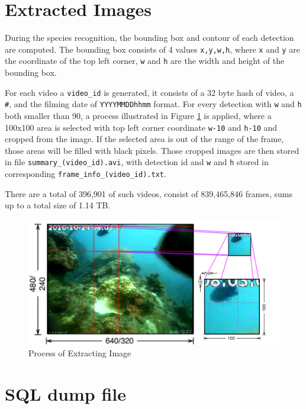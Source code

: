 \documentclass[bsc,logo,twoside,fullspacing,parskip]{infthesis}
\begin{document}
\section{Extracted Images}
\label{sec:summaries}

During the species recognition, the bounding box and contour of each detection are computed.
The bounding box consists of 4 values {\tt x,y,w,h}, where {\tt x} and {\tt y} are the coordinate of the top left corner, {\tt w} and {\tt h} are the width and height of the bounding box. 

For each video a {\tt video\_id} is generated, it consists of a 32 byte hash of video, a {\tt \#}, and the filming date of {\tt YYYYMMDDhhmm} format. 
For every detection with {\tt w} and {\tt h} both smaller than 90, a process illustrated in Figure \ref{fig:extraction} is applied, where a 100x100 area is selected with top left corner coordinate {\tt w-10} and {\tt h-10} and cropped from the image. 
If the selected area is out of the range of the frame, those areas will be filled with black pixels.
Those cropped images are then stored in file {\tt summary\_(video\_id).avi}, with detection id and {\tt w} and {\tt h} stored in corresponding {\tt frame\_info\_(video\_id).txt}.

There are a total of 396,901 of such videos, consist of 839,465,846 frames, sums up to a total size of 1.14 TB.

\begin{figure}
    \centering
    \includegraphics[scale=0.3]{graph/extraction.png}
    \caption{Process of Extracting Image}
    \label{fig:extraction}
\end{figure}

\section{SQL dump file}
\label{sec:sqld}
\end{document}

